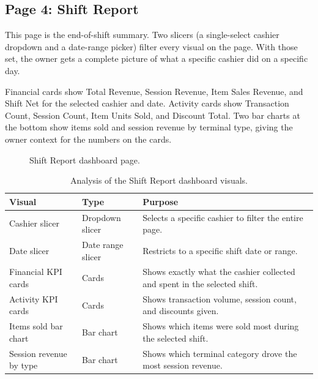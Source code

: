 \documentclass[12pt, a4paper]{report}
\begin{document}
\subsection{Page 4: Shift Report}

This page is the end-of-shift summary. Two slicers (a single-select cashier dropdown and a date-range picker) filter
every visual on the page. With those set,
the owner gets a complete picture of what a specific cashier did on a specific day.

Financial cards show Total Revenue, Session Revenue, Item Sales Revenue, and Shift
Net for the selected cashier and date. Activity cards show Transaction Count, Session
Count, Item Units Sold, and Discount Total. Two bar charts at the bottom show items
sold and session revenue by terminal type, giving the owner context for the numbers
on the cards.

\begin{figure}[H]
  \centering
  \caption{Shift Report dashboard page.\label{fig:dash_shift}}
\end{figure}

\begin{table}[H]
  \centering
  \caption{Analysis of the Shift Report dashboard visuals.\label{tab:shift_analysis}}
  \begin{tabular}{p{3.5cm} p{2.5cm} p{7cm}}
    \toprule
    \textbf{Visual} & \textbf{Type} & \textbf{Purpose} \\
    \midrule
    Cashier slicer
      & Dropdown slicer
      & Selects a specific cashier to filter the entire page. \\[4pt]
    Date slicer
      & Date range slicer
      & Restricts to a specific shift date or range. \\[4pt]
    Financial KPI cards
      & Cards
      & Shows exactly what the cashier collected and spent in the selected shift. \\[4pt]
    Activity KPI cards
      & Cards
      & Shows transaction volume, session count, and discounts given. \\[4pt]
    Items sold bar chart
      & Bar chart
      & Shows which items were sold most during the selected shift. \\[4pt]
    Session revenue by type
      & Bar chart
      & Shows which terminal category drove the most session revenue. \\
    \bottomrule
  \end{tabular}
\end{table}
\end{document}
